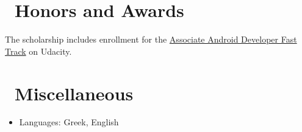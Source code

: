 \documentclass{resume}
\begin{document}
\section{\faHeartO\ Honors and Awards}
The scholarship includes enrollment for the \href{https://www.udacity.com/course/associate-android-developer-fast-track--nd818}{Associate Android Developer Fast Track} on Udacity. 

\section{\faInfo\ Miscellaneous}
\begin{itemize}[parsep=0.5ex]
  \item Languages: Greek, English
\end{itemize}

%
%
\end{document}
